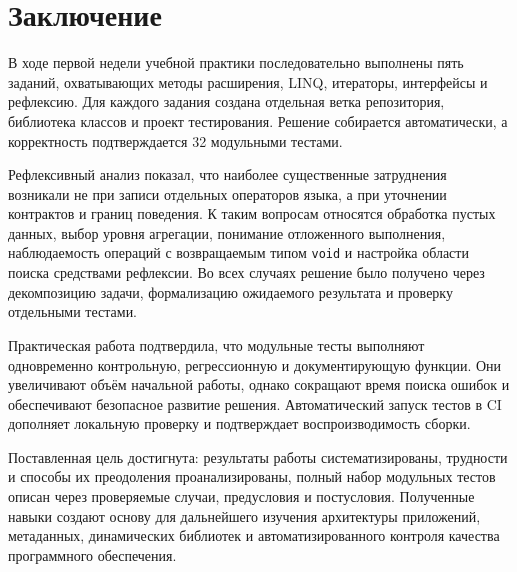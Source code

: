 \clearpage
\section*{Заключение}

В ходе первой недели учебной практики последовательно выполнены пять заданий, охватывающих методы расширения, LINQ, итераторы, интерфейсы и рефлексию. Для каждого задания создана отдельная ветка репозитория, библиотека классов и проект тестирования. Решение собирается автоматически, а корректность подтверждается 32 модульными тестами.

Рефлексивный анализ показал, что наиболее существенные затруднения возникали не при записи отдельных операторов языка, а при уточнении контрактов и границ поведения. К таким вопросам относятся обработка пустых данных, выбор уровня агрегации, понимание отложенного выполнения, наблюдаемость операций с возвращаемым типом \texttt{void} и настройка области поиска средствами рефлексии. Во всех случаях решение было получено через декомпозицию задачи, формализацию ожидаемого результата и проверку отдельными тестами.

Практическая работа подтвердила, что модульные тесты выполняют одновременно контрольную, регрессионную и документирующую функции. Они увеличивают объём начальной работы, однако сокращают время поиска ошибок и обеспечивают безопасное развитие решения. Автоматический запуск тестов в CI дополняет локальную проверку и подтверждает воспроизводимость сборки.

Поставленная цель достигнута: результаты работы систематизированы, трудности и способы их преодоления проанализированы, полный набор модульных тестов описан через проверяемые случаи, предусловия и постусловия. Полученные навыки создают основу для дальнейшего изучения архитектуры приложений, метаданных, динамических библиотек и автоматизированного контроля качества программного обеспечения.
